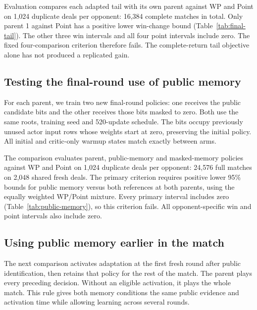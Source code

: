 \documentclass[11pt]{article}
\begin{document}
Evaluation compares each adapted tail with its own parent against WP and Point
on 1,024 duplicate deals per opponent: 16,384 complete matches in total.
Only parent 1 against Point has a positive lower win-change bound
(Table~\ref{tab:final-tail}). The other three win intervals and all four point
intervals include zero. The fixed four-comparison criterion therefore fails.
The complete-return tail objective alone has not produced a replicated gain.

\begin{table}[ht]
\centering\small

\caption{Final-round adaptation minus its unchanged parent. Win changes are
percentage points; point changes are final learner-minus-opponent margins.
Brackets give paired 95\% intervals.}
\label{tab:final-tail}
\end{table}

\subsection{Testing the final-round use of public memory}
For each parent, we train two new final-round policies: one receives the public
candidate bits and the other receives those bits masked to zero. Both use the
same roots, training seed and 520-update schedule. The bits occupy previously
unused actor input rows whose weights start at zero, preserving the initial
policy. All initial and critic-only warmup states match exactly between arms.

The comparison evaluates parent, public-memory and masked-memory policies
against WP and Point on 1,024 duplicate deals per opponent: 24,576 full matches
on 2,048 shared fresh deals. The primary criterion requires positive lower
95\% bounds for public memory versus both references at both parents, using
the equally weighted WP/Point mixture. Every primary interval includes zero
(Table~\ref{tab:public-memory}), so this criterion fails. All opponent-specific
win and point intervals also include zero.

\begin{table}[ht]
\centering\small

\caption{Public-memory final-round policy minus each reference, equally weighted
over WP and Point. Brackets give stratified paired 95\% intervals. The four
win comparisons form the primary criterion; all include zero.}
\label{tab:public-memory}
\end{table}

\subsection{Using public memory earlier in the match}
The next comparison activates adaptation at the first fresh round after public
identification, then retains that policy for the rest of the match. The parent
plays every preceding decision. Without an eligible activation, it plays the
whole match. This rule gives both memory conditions the same public evidence
and activation time while allowing learning across several rounds.
\end{document}
